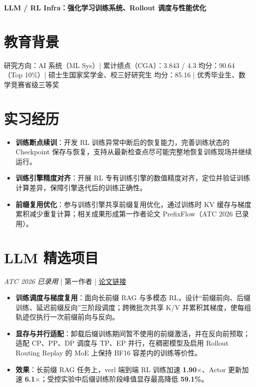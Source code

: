 \documentclass{resume}
\begin{document}
\centerline{\textbf{LLM / RL Infra：强化学习训练系统、Rollout 调度与性能优化}}
\vspace{0.12cm}

\section{教育背景}
研究方向：AI 系统（ML Sys）\quad | \quad 累计绩点（CGA）：3.843 / 4.3
均分：90.64（Top 10\%）\quad | \quad 硕士生国家奖学金、校三好研究生
均分：85.16 \quad | \quad 优秀毕业生、数学竞赛省级三等奖

\section{实习经历}
\begin{itemize}
  \item \textbf{训练断点续训}：开发 RL 训练异常中断后的恢复能力，完善训练状态的 Checkpoint 保存与恢复，支持从最新检查点尽可能完整地恢复训练现场并继续运行。
  \item \textbf{训练引擎精度对齐}：开展 RL 专有训练引擎的数值精度对齐，定位并验证训练计算差异，保障引擎迭代后的训练正确性。
  \item \textbf{前缀复用优化}：参与训练引擎共享前缀复用优化，通过训练时 KV 缓存与梯度累积减少重复计算；相关成果形成第一作者论文 PrefixFlow（ATC 2026 已录用）。
\end{itemize}

\section{LLM 精选项目}
\textit{ATC 2026 已录用} \quad | \quad 第一作者 \quad | \quad \href{https://arxiv.org/html/2606.01143v4}{论文链接}
\begin{itemize}
  \item \textbf{训练调度与梯度复用}：面向长前缀 RAG 与多模态 RL，设计“前缀前向、后缀训练、延迟前缀反向”三阶段调度；跨微批次共享 K/V 并累积其梯度，使每组轨迹仅执行一次前缀前向与反向。
  \item \textbf{显存与并行适配}：卸载后缀训练期间暂不使用的前缀激活，并在反向前预取；适配 CP、PP、DP 调度与 TP、EP 并行，在稠密模型及启用 Rollout Routing Replay 的 MoE 上保持 BF16 容差内的训练等价性。
  \item \textbf{效果}：长前缀 RAG 任务上，verl 端到端 RL 训练加速 \textbf{1.90$\times$}、Actor 更新加速 \textbf{6.1$\times$}；受控实验中后缀训练阶段峰值显存最高降低 \textbf{59.1\%}。
\end{itemize}
\vspace{0.1cm}
\end{document}
